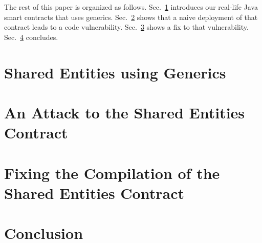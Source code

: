 \documentclass{llncs}
\begin{document}
The rest of this paper is organized as follows.
Sec.~\ref{sec:shared_entities} introduces our real-life Java smart
contracts that uses generics. Sec.~\ref{sec:attack} shows that a naive
deployment of that contract leads to a code vulnerability.
Sec.~\ref{sec:fix} shows a fix to that vulnerability.
Sec.~\ref{sec:conclusion} concludes.

\section{Shared Entities using Generics}\label{sec:shared_entities}

\section{An Attack to the Shared Entities Contract}\label{sec:attack}

\section{Fixing the Compilation of the Shared Entities Contract} \label{sec:fix}

\section{Conclusion}\label{sec:conclusion} 



\end{document}
